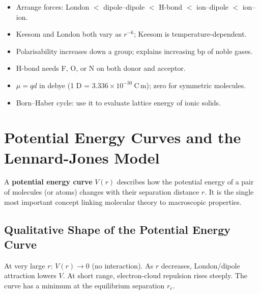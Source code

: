 \documentclass[12pt,a4paper]{article}
\begin{document}
\begin{tcolorbox}[exambox, title={Exam Points (Section 1)}]
\begin{itemize}[leftmargin=*, itemsep=2pt, topsep=2pt]
  \item Arrange forces: London $<$ dipole--dipole $<$ H-bond $<$ ion--dipole $<$ ion--ion.
  \item Keesom and London both vary as $r^{-6}$; Keesom is temperature-dependent.
  \item Polarisability increases down a group; explains increasing bp of noble gases.
  \item H-bond needs F, O, or N on both donor and acceptor.
  \item $\mu = qd$ in debye (1 D = $3.336\times10^{-30}\ \mathrm{C\,m}$); zero for symmetric molecules.
  \item Born--Haber cycle: use it to evaluate lattice energy of ionic solids.
\end{itemize}
\end{tcolorbox}

\section{Potential Energy Curves and the Lennard-Jones Model}

\begin{tcolorbox}[defbox]
A \textbf{potential energy curve} $V(r)$ describes how the potential energy of a pair of molecules (or atoms) changes with their separation distance $r$. It is the single most important concept linking molecular theory to macroscopic properties.
\end{tcolorbox}

\subsection{Qualitative Shape of the Potential Energy Curve}
At very large $r$: $V(r) \to 0$ (no interaction). As $r$ decreases, London/dipole attraction lowers $V$. At short range, electron-cloud repulsion rises steeply. The curve has a minimum at the equilibrium separation $r_e$.
\end{document}
